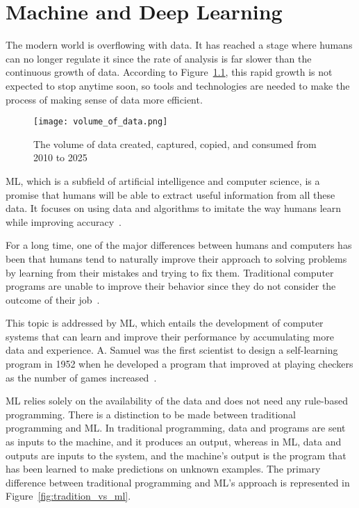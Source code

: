 \chapter{Machine and Deep Learning} \label{sec:ml}

The modern world is overflowing with data. It has reached a stage where humans can no longer regulate it since the rate of analysis is far slower than the continuous growth of data. According to Figure~\ref{fig:volume_of_data}, this rapid growth is not expected to stop anytime soon, so tools and technologies are needed to make the process of making sense of data more efficient.

\begin{figure}[htbp]
    \centering
    \texttt{[image: volume\_of\_data.png]}
    \caption{The volume of data created, captured, copied, and consumed from 2010 to 2025~\cite{TotalStatista}}
    \label{fig:volume_of_data}
\end{figure}

\gls{ML}, which is a subfield of artificial intelligence and computer science, is a promise that humans will be able to extract useful information from all these data. It focuses on using data and algorithms to imitate the way humans learn while improving accuracy~\cite{IBMCloudEducationWhatLearning}.

For a long time, one of the major differences between humans and computers has been that humans tend to naturally improve their approach to solving problems by learning from their mistakes and trying to fix them. Traditional computer programs are unable to improve their behavior since they do not consider the outcome of their job~\cite{Luckert2016UsingDocuments}. 

This topic is addressed by \gls{ML}, which entails the development of computer systems that can learn and improve their performance by accumulating more data and experience. A. Samuel was the first scientist to design a self-learning program in 1952 when he developed a program that improved at playing checkers as the number of games increased~\cite{Samuel1959SomeCheckers,Luckert2016UsingDocuments}. 

\gls{ML} relies solely on the availability of the data and does not need any rule-based programming. There is a distinction to be made between traditional programming and \gls{ML}. In traditional programming, data and programs are sent as inputs to the machine, and it produces an output, whereas in \gls{ML}, data and outputs are inputs to the system, and the machine's output is the program that has been learned to make predictions on unknown examples. The primary difference between traditional programming and \gls{ML}'s approach is represented in Figure~\ref{fig:tradition_vs_ml}.

